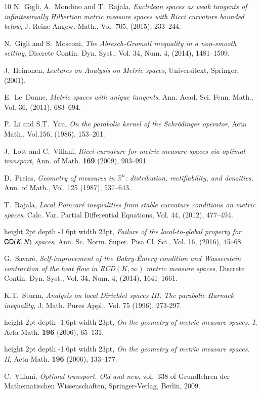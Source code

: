 \documentclass[11pt,reqno]{amsart}
\newcommand{\R}{\mathbb{R}}
\newcommand{\CD}{{\sf CD}}
\theoremstyle{definition}
\theoremstyle{remark}
\theoremstyle{remark}
\theoremstyle{remark}
\theoremstyle{remark}
\theoremstyle{remark}
\theoremstyle{remark}
\theoremstyle{remark}
\begin{document}
\begin{thebibliography}{10}
{\sc N.~Gigli, A.~Mondino and T.~Rajala},
{\em Euclidean spaces as weak tangents of infinitesimally Hilbertian metric measure spaces with Ricci curvature bounded below}, J. Reine Angew. Math., Vol. 705,  (2015), 233--244. 

{\sc N.~Gigli and S.~Mosconi},
{\em The Abresch-Gromoll inequality in a non-smooth setting}, Discrete Contin. Dyn. Syst., Vol. 34, Num. 4,  (2014), 1481--1509.

{\sc  J.~Heinonen},
{\em Lectures on Analysis on Metric spaces}, Universitext, Springer,  (2001).

 {\sc E.~Le~Donne},
 {\em Metric spaces with unique tangents},
 Ann. Acad. Sci. Fenn. Math., Vol. 36, (2011), 683--694.

{\sc P.~Li and S.T.~Yau}, {\em On the parabolic kernel of the Schr\"odinger operator},  Acta Math., Vol.156, (1986), 153--201.

{\sc J.~Lott and C.~Villani}, 
{\em Ricci curvature for metric-measure spaces
  via optimal transport}, Ann. of Math. \textbf{169} (2009), 903--991.

 {\sc D.~Preiss},
 {\em Geometry of measures in $\R^n$: distribution, rectifiability, and densities},
 Ann. of Math., Vol. 125 (1987), 537--643.

 {\sc T.~Rajala},
 {\em Local Poincar\'e inequalities from stable curvature conditions on metric spaces},
 Calc. Var. Partial Differential Equations, Vol. 44,  (2012), 477--494.
 
\leavevmode\vrule height 2pt depth -1.6pt width 23pt,
 {\em Failure of the local-to-global property for $\CD(K,N)$ spaces}, Ann. Sc. Norm. Super. Pisa Cl. Sci., Vol. 16, (2016), 45--68. 


{\sc G.~Savar\'e}, {\em Self-improvement of the {Bakry-\'Emery condition and
  Wasserstein contraction of the heat flow in RCD$(K,\infty)$} metric measure
  spaces},   Discrete Contin. Dyn. Syst., Vol. 34, Num. 4, (2014), 1641--1661.
 
  
{\sc K.T.~Sturm}, {\em Analysis on local Dirichlet spaces III. The parabolic Harnack inequality},  J. Math. Pures Appl., Vol. 75 (1996), 273-297.  

\leavevmode\vrule height 2pt depth -1.6pt width 23pt,
{\em On the geometry of
  metric measure spaces. {I}}, Acta Math. \textbf{196} (2006), 65--131.

\leavevmode\vrule height 2pt depth -1.6pt width 23pt,
 {\em On the geometry of
  metric measure spaces. {II}}, Acta Math. \textbf{196} (2006), 133--177.

{\sc C.~Villani}, {\em Optimal transport. Old and new}, vol.~338 of Grundlehren
  der Mathematischen Wissenschaften, Springer-Verlag, Berlin, 2009.
\end{thebibliography}

\
\end{document}
